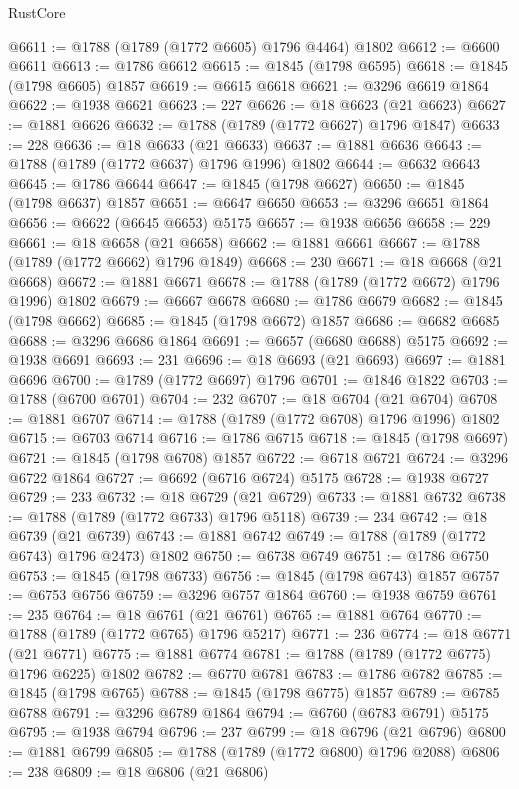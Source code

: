 \begin{lexlean}{RustCore}
\begin{coremodule}
@6611 := @1788 (@1789 (@1772 @6605) @1796 @4464) @1802
@6612 := @6600 @6611
@6613 := @1786 @6612
@6615 := @1845 (@1798 @6595)
@6618 := @1845 (@1798 @6605) @1857
@6619 := @6615 @6618
@6621 := @3296 @6619 @1864
@6622 := @1938 @6621
@6623 := 227
@6626 := @18 @6623 (@21 @6623)
@6627 := @1881 @6626
@6632 := @1788 (@1789 (@1772 @6627) @1796 @1847)
@6633 := 228
@6636 := @18 @6633 (@21 @6633)
@6637 := @1881 @6636
@6643 := @1788 (@1789 (@1772 @6637) @1796 @1996) @1802
@6644 := @6632 @6643
@6645 := @1786 @6644
@6647 := @1845 (@1798 @6627)
@6650 := @1845 (@1798 @6637) @1857
@6651 := @6647 @6650
@6653 := @3296 @6651 @1864
@6656 := @6622 (@6645 @6653) @5175
@6657 := @1938 @6656
@6658 := 229
@6661 := @18 @6658 (@21 @6658)
@6662 := @1881 @6661
@6667 := @1788 (@1789 (@1772 @6662) @1796 @1849)
@6668 := 230
@6671 := @18 @6668 (@21 @6668)
@6672 := @1881 @6671
@6678 := @1788 (@1789 (@1772 @6672) @1796 @1996) @1802
@6679 := @6667 @6678
@6680 := @1786 @6679
@6682 := @1845 (@1798 @6662)
@6685 := @1845 (@1798 @6672) @1857
@6686 := @6682 @6685
@6688 := @3296 @6686 @1864
@6691 := @6657 (@6680 @6688) @5175
@6692 := @1938 @6691
@6693 := 231
@6696 := @18 @6693 (@21 @6693)
@6697 := @1881 @6696
@6700 := @1789 (@1772 @6697) @1796
@6701 := @1846 @1822
@6703 := @1788 (@6700 @6701)
@6704 := 232
@6707 := @18 @6704 (@21 @6704)
@6708 := @1881 @6707
@6714 := @1788 (@1789 (@1772 @6708) @1796 @1996) @1802
@6715 := @6703 @6714
@6716 := @1786 @6715
@6718 := @1845 (@1798 @6697)
@6721 := @1845 (@1798 @6708) @1857
@6722 := @6718 @6721
@6724 := @3296 @6722 @1864
@6727 := @6692 (@6716 @6724) @5175
@6728 := @1938 @6727
@6729 := 233
@6732 := @18 @6729 (@21 @6729)
@6733 := @1881 @6732
@6738 := @1788 (@1789 (@1772 @6733) @1796 @5118)
@6739 := 234
@6742 := @18 @6739 (@21 @6739)
@6743 := @1881 @6742
@6749 := @1788 (@1789 (@1772 @6743) @1796 @2473) @1802
@6750 := @6738 @6749
@6751 := @1786 @6750
@6753 := @1845 (@1798 @6733)
@6756 := @1845 (@1798 @6743) @1857
@6757 := @6753 @6756
@6759 := @3296 @6757 @1864
@6760 := @1938 @6759
@6761 := 235
@6764 := @18 @6761 (@21 @6761)
@6765 := @1881 @6764
@6770 := @1788 (@1789 (@1772 @6765) @1796 @5217)
@6771 := 236
@6774 := @18 @6771 (@21 @6771)
@6775 := @1881 @6774
@6781 := @1788 (@1789 (@1772 @6775) @1796 @6225) @1802
@6782 := @6770 @6781
@6783 := @1786 @6782
@6785 := @1845 (@1798 @6765)
@6788 := @1845 (@1798 @6775) @1857
@6789 := @6785 @6788
@6791 := @3296 @6789 @1864
@6794 := @6760 (@6783 @6791) @5175
@6795 := @1938 @6794
@6796 := 237
@6799 := @18 @6796 (@21 @6796)
@6800 := @1881 @6799
@6805 := @1788 (@1789 (@1772 @6800) @1796 @2088)
@6806 := 238
@6809 := @18 @6806 (@21 @6806)

\end{coremodule}
\end{lexlean}
